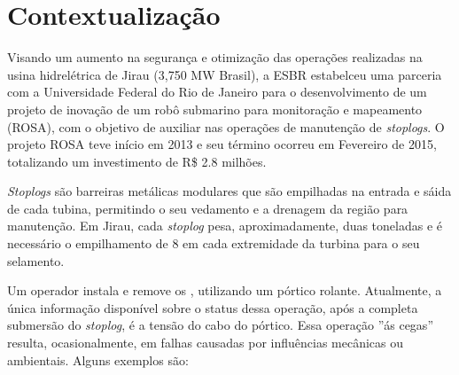 \section*{Contextualização}
Visando um aumento na segurança e otimização das operações realizadas na usina 
hidrelétrica de Jirau (3,750 MW Brasil), a ESBR estabelceu uma parceria com a 
Universidade Federal do Rio de Janeiro para o desenvolvimento de um projeto de 
inovação de um robô submarino para monitoração e mapeamento (ROSA), com o
objetivo de auxiliar nas operações de manutenção de \textit{stoplogs}. O projeto
ROSA teve início em 2013 e seu término ocorreu em Fevereiro de 2015, totalizando
um investimento de R\$ 2.8 milhões.

\textit{Stoplogs} são barreiras metálicas modulares que são empilhadas na
entrada e sáida de cada tubina, permitindo o seu vedamento e a drenagem da
região para manutenção. Em Jirau, cada \textit{stoplog} pesa, aproximadamente,
duas toneladas e é necessário o empilhamento de 8  em cada extremidade
da turbina para o seu selamento.

Um operador instala e remove os , utilizando um pórtico
rolante. Atualmente, a única informação disponível sobre o status dessa
operação, após a completa submersão do \textit{stoplog}, é a tensão do cabo do
pórtico. Essa operação ''ás cegas'' resulta, ocasionalmente, em falhas causadas 
por influências mecânicas ou ambientais. Alguns exemplos são:

